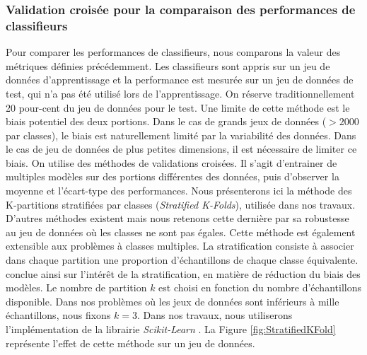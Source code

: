 
\subsubsection{Validation croisée pour la comparaison des performances de classifieurs} \label{subsubsec:cross_val}
Pour comparer les performances de classifieurs, nous comparons la valeur des métriques définies précédemment.
Les classifieurs sont appris sur un jeu de données d'apprentissage et la performance est mesurée sur un jeu de données de test, qui n'a pas été utilisé lors de l'apprentissage.
On réserve traditionnellement 20 pour-cent du jeu de données pour le test.
Une limite de cette méthode est le biais potentiel des deux portions.
Dans le cas de grands jeux de données ($> 2 000$ par classes), le biais est naturellement limité par la variabilité des données.
Dans le cas de jeu de données de plus petites dimensions, il est nécessaire de limiter ce biais.
On utilise des méthodes de validations croisées.
Il s'agit d'entrainer de multiples modèles sur des portions différentes des données, puis d'observer la moyenne et l'écart-type des performances.
Nous présenterons ici la méthode des K-partitions stratifiées par classes (\textit{Stratified K-Folds}), utilisée dans nos travaux.
D'autres méthodes existent mais nous retenons cette dernière par sa robustesse au jeu de données où les classes ne sont pas égales.
Cette méthode est également extensible aux problèmes à classes multiples.
La stratification consiste à associer dans chaque partition une proportion d'échantillons de chaque classe équivalente.
\cite{kohavi_study_1995} conclue ainsi sur l'intérêt de la stratification, en matière de réduction du biais des modèles.
Le nombre de partition $k$ est choisi en fonction du nombre d'échantillons disponible.
Dans nos problèmes où les jeux de données sont inférieurs à mille échantillons, nous fixons $k=3$.
Dans nos travaux, nous utiliserons l'implémentation de la librairie \textit{Scikit-Learn} \cite{pedregosa_scikit-learn_2011}.
La Figure \ref{fig:StratifiedKFold} représente l'effet de cette méthode sur un jeu de données.

